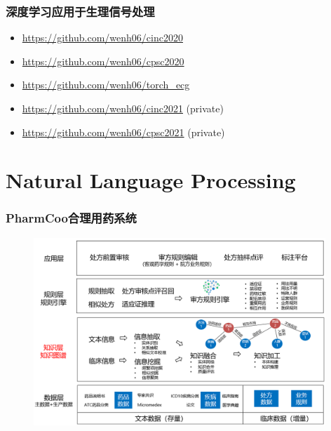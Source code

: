 \begin{frame}
\frametitle{深度学习应用于生理信号处理}

\begin{itemize}
\item \href{https://github.com/wenh06/cinc2020}{https://github.com/wenh06/cinc2020}
\vspace{1em}
\item \href{https://github.com/wenh06/cpsc2020}{https://github.com/wenh06/cpsc2020}
\vspace{1em}
\item \href{https://github.com/wenh06/torch_ecg}{https://github.com/wenh06/torch\_ecg}
\vspace{1em}
\item \href{https://github.com/wenh06/cinc2021}{https://github.com/wenh06/cinc2021} (private)
\vspace{1em}
\item \href{https://github.com/wenh06/cpsc2021}{https://github.com/wenh06/cpsc2021} (private)
\end{itemize}

\end{frame}


\section[NLP]{Natural Language Processing}


\begin{frame}
\frametitle{PharmCoo合理用药系统}

\begin{figure}
\centering
\includegraphics[width=0.98\textwidth,keepaspectratio]{images/pharmcoo.png}
\end{figure}

\end{frame}


